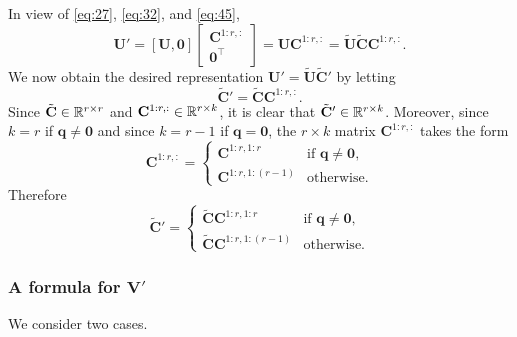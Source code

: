 \documentclass[11pt,a4paper]{article}
\theoremstyle{break}
\numberwithin{dummy}{section}
\theoremstyle{plain}
\theoremstyle{plain}
\theoremstyle{plain}
\theoremstyle{plain}
\theoremstyle{plain}
\theoremstyle{MyNonumberplain}
\newcommand{\0}{\M{0}}
\newcommand{\M}[1]{\mathbf{#1}}
\newcommand{\Mt}[1]{\tilde{\M{#1}}}
\newcommand{\R}{\mathbb{R}}
\newcommand{\T}{\top}
\newcommand{\ve}[1]{\mathbf{#1}}
\newcommand{\Mat}[2]{%
  \ifthenelse{\equal{#2}{1}}
  {\R^{#1}}
  {\R^{#1 \times #2}}
}
\begin{document}
In view of \eqref{eq:27}, \eqref{eq:32}, and \eqref{eq:45},
\begin{displaymath}
  \M{U}'
  = [\M{U}, \0]
  \begin{bmatrix}
    \M{C}^{1:r, :}
    \\
    \0^\T
  \end{bmatrix}
  = \M{U} \M{C}^{1:r, :}
  = \Mt{U} \Mt{C}  \M{C}^{1:r, :}.
\end{displaymath}
We now obtain the desired representation
\begin{math}
  \M{U}' = \Mt{U} \Mt{C}'
\end{math}
by letting
\begin{displaymath}
  \Mt{C}' = \Mt{C}  \M{C}^{1:r, :}.
\end{displaymath}
Since $\Mt{C} \in \Mat{r}{r}$ and $\M{C}^{1:r, :} \in \Mat{r}{k}$, it is clear that $\Mt{C}' \in \Mat{r}{k}$. Moreover, since $k = r$ if $\ve{q} \neq \0$ and since $k = r - 1$ if $\ve{q} = \0$, the $r \times k$ matrix $\M{C}^{1:r,:}$ takes the form
\begin{displaymath}
  \M{C}^{1:r, :}
  =
  \begin{cases}
    \M{C}^{1:r, 1:r} & \text{if $\ve{q} \neq \0$},
    \\
    \M{C}^{1:r, 1:(r-1)} & \text{otherwise}.
  \end{cases}
\end{displaymath}
Therefore
\begin{displaymath}
  \Mt{C}' 
  =
  \begin{cases}
    \Mt{C}  \M{C}^{1:r, 1:r} & \text{if $\ve{q} \neq \0$},
    \\
    \Mt{C}  \M{C}^{1:r, 1:(r-1)} & \text{otherwise}.
  \end{cases}
\end{displaymath}

\subsubsection{A formula for $\M{V}'$}

We consider two cases.
\end{document}
